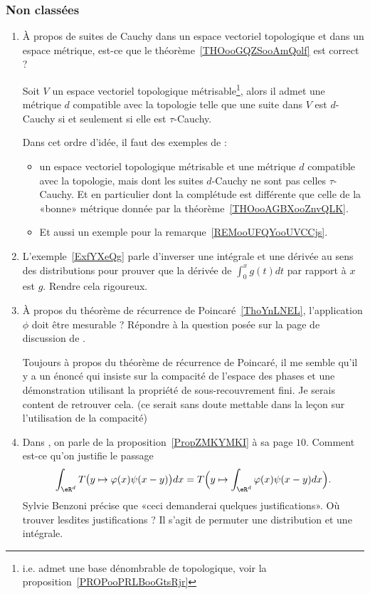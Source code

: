 \subsubsection{Non classées}

\begin{enumerate}
    \item
        À propos de suites de Cauchy dans un espace vectoriel topologique et dans un espace métrique, est-ce que le théorème~\ref{THOooGQZSooAmQolf} est correct ?

        Soit \( V\) un espace vectoriel topologique métrisable\footnote{i.e. admet une base dénombrable de topologique, voir la proposition~\ref{PROPooPRLBooGtsRjr}}, alors il admet une métrique \( d\) compatible avec la topologie telle que une suite dans \( V\) est \( d\)-Cauchy si et seulement si elle est \( \tau\)-Cauchy.

        Dans cet ordre d'idée, il faut des exemples de :
        \begin{itemize}
            \item un espace vectoriel topologique métrisable et une métrique \( d\) compatible avec la topologie, mais dont les suites \( d\)-Cauchy ne sont pas celles \( \tau\)-Cauchy. Et en particulier dont la complétude est différente que celle de la «bonne» métrique donnée par la théorème~\ref{THOooAGBXooZnvQLK}.
            \item Et aussi un exemple pour la remarque~\ref{REMooUFQYooUVCCjs}.
        \end{itemize}
    \item
        L'exemple~\ref{ExfYXeQg} parle d'inverser une intégrale et une dérivée au sens des distributions pour prouver que la dérivée de \( \int_0^xg(t)dt\) par rapport à \( x\) est \( g\). Rendre cela rigoureux.
    \item
        À propos du théorème de récurrence de Poincaré~\ref{ThoYnLNEL}, l'application \( \phi\) doit être mesurable ? Répondre à la question posée sur la page de discussion de .

        Toujours à propos du théorème de récurrence de Poincaré, il me semble qu'il y a un énoncé qui insiste sur la compacité de l'espace des phases et une démonstration utilisant la propriété de sous-recouvrement fini. Je serais content de retrouver cela. (ce serait sans doute mettable dans la leçon sur l'utilisation de la compacité)
        \item
            Dans \cite{OEVAuEz}, on parle de la proposition~\ref{PropZMKYMKI} à sa page \( 10\). Comment est-ce qu'on justifie le passage
            \begin{equation}
                \int_{\eR^d}T\big( y\mapsto \varphi(x)\psi(x-y) \big)dx=T\Big( y\mapsto\int_{\eR^d}\varphi(x)\psi(x-y)dx \Big).
            \end{equation}
            Sylvie Benzoni précise que «ceci demanderai quelques justifications». Où trouver lesdites justifications ? Il s'agit de permuter une distribution et une intégrale.


\end{enumerate}
